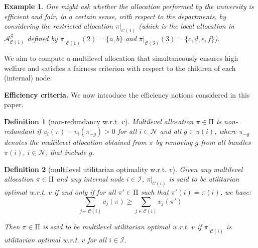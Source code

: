 \documentclass[]{article}
\newtheorem{definition}{Definition}
\newtheorem{example}{Example}
\newcommand{\nodes}{\mathcal{N}}
\newcommand{\items}{\mathcal{G}}
\newcommand{\children}{\mathcal{C}}
\newcommand{\internal}{\mathcal{I}}
\newcommand{\mallocations}{\mathrm{\Pi}}
\newcommand{\allocations}{\mathcal{A}}
\begin{document}
\begin{example}
    
    One might ask whether the allocation performed by the university is efficient and fair, in a certain sense, with respect to the departments, by considering the restricted allocation $\pi|_{\children(1)}$ (which is the local allocation in $\allocations^\items_{\children(1)}$ defined by $\pi|_{\children(1)}(2)= \{a,b\}$ and $\pi|_{\children(3)}(3)= \{c,d,e,f\}$).

\end{example}

We aim to compute a multilevel allocation that simultaneously ensures high welfare and satisfies a fairness criterion with respect to the children of each (internal) node.

\medskip

\noindent \textbf{Efficiency criteria.}  We now introduce the efficiency notions considered in this paper.

\begin{definition}[non-redundancy w.r.t. $v$] \label{definition: non-redundancy} 
Multilevel allocation $\pi \in \mallocations$ is \emph{non-redundant} if 
$v_i(\pi) - v_i(\pi_{-g}) > 0$ for all $i \in \nodes$ and all $g \in \pi(i)$, where $\pi_{-g}$ denotes the multilevel allocation obtained from $\pi$ by removing $g$ from all bundles $\pi(i)$, $i \in \nodes$, that include $g$.
\end{definition}

\begin{definition}[multilevel utilitarian optimality w.r.t. $v$] \label{def: multilevel usw} Given any multilevel allocation $\pi  \in  \mallocations$ and any internal node $i \in \internal$, $\pi \vert_{\children(i)}$ is said to be \emph{utilitarian optimal w.r.t. $v$} if and only if for all $\pi' \in \mallocations$ such that $\pi'(i) = \pi(i)$, we have:
$$
\sum_{j \in \children(i)} v_{j}(\pi) \ge \sum_{j \in \children(i)} v_{j}(\pi')
$$


\noindent Then $\pi \in \mallocations$ is said to be \emph{multilevel utilitarian optimal w.r.t. $v$} if $\pi \vert_{\children(i)}$ is utilitarian optimal w.r.t. $v$ for all $i\in \internal$.
\end{definition}
\end{document}
